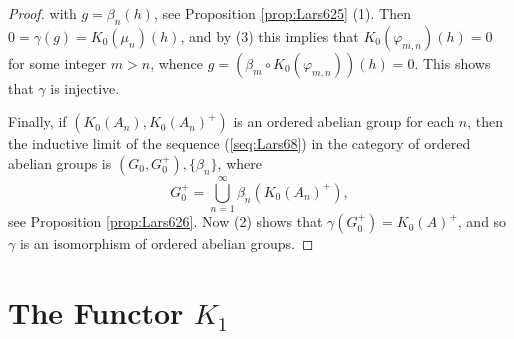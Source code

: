 \documentclass{book}
\begin{document}
\begin{proof}
  with \(g=\beta_n(h)\), see Proposition \ref{prop:Lars625} (1). Then \(0=\gamma(g)=K_0(\mu_n)(h)\),
  and by (3) this implies that \(K_0(\varphi_{m,n})(h)=0\) for some integer \(m>n\), whence
  \(g=(\beta_m\circ K_0(\varphi_{m,n}))(h)=0\). This shows that \(\gamma\) is injective.\par
  Finally, if \((K_0(A_n),K_0(A_n)^+)\) is an ordered abelian group for each \(n\), then
  the inductive limit of the sequence (\ref{seq:Lars68}) in the category of ordered abelian groups is \((G_0,G_0^+),\{\beta_n\}\), where
  \[
    G_0^+=\bigcup_{n=1}^\infty\beta_n(K_0(A_n)^+),
  \]
  see Proposition \ref{prop:Lars626}. Now (2) shows that \(\gamma(G_0^+)=K_0(A)^+\), and so \(\gamma\) is an
  isomorphism of ordered abelian groups.
\end{proof}

\chapter{The Functor \texorpdfstring{\(K_1\)}{K1}}
\end{document}
